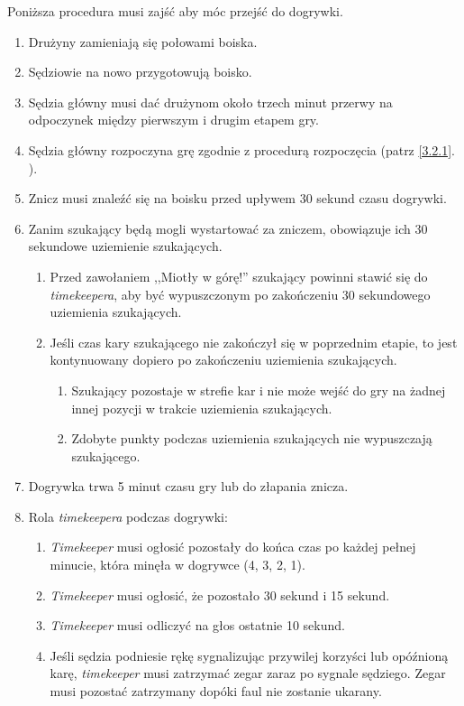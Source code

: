 \documentclass[11pt,a4paper]{article}
\renewcommand{\subsubsection}[1]{
  \oldsubsubsection{#1}%
  \label{\thesubsubsection}
}
\newcommand{\myref}[1]{\ref{#1}. \nameref{#1}}
\begin{document}
\subsubsection{Dogrywka}
Poniższa procedura musi zajść aby móc przejść do dogrywki.
\begin{enumerate}
  \item Drużyny zamieniają się połowami boiska.
  \item Sędziowie na nowo przygotowują boisko.
  \item Sędzia główny musi dać drużynom około trzech minut przerwy na odpoczynek między pierwszym i drugim etapem gry.
  \item Sędzia główny rozpoczyna grę zgodnie z procedurą rozpoczęcia (patrz \myref{3.2.1}).
  \item Znicz musi znaleźć się na boisku przed upływem 30 sekund czasu dogrywki.
  \item Zanim szukający będą mogli wystartować za zniczem, obowiązuje ich 30 sekundowe uziemienie szukających.
  \begin{enumerate}
    \item Przed zawołaniem ,,Miotły w górę!'' szukający powinni stawić się do \emph{timekeepera}, aby być wypuszczonym po zakończeniu 30 sekundowego uziemienia szukających.
    \item Jeśli czas kary szukającego nie zakończył się w poprzednim etapie, to jest kontynuowany dopiero po zakończeniu uziemienia szukających.
    \begin{enumerate}
      \item Szukający pozostaje w strefie kar i nie może wejść do gry na żadnej innej pozycji w trakcie uziemienia szukających.
      \item Zdobyte punkty podczas uziemienia szukających nie wypuszczają szukającego.
    \end{enumerate}
  \end{enumerate}
  \item Dogrywka trwa 5 minut czasu gry lub do złapania znicza.
  \item Rola \emph{timekeepera} podczas dogrywki:
  \begin{enumerate}
    \item \emph{Timekeeper} musi ogłosić pozostały do końca czas po każdej pełnej minucie, która minęła
    w dogrywce (4, 3, 2, 1).
    \item \emph{Timekeeper} musi ogłosić, że pozostało 30 sekund i 15 sekund.
    \item \emph{Timekeeper} musi odliczyć na głos ostatnie 10 sekund.
    \item Jeśli sędzia podniesie rękę sygnalizując przywilej korzyści lub opóźnioną karę, \emph{timekeeper} musi zatrzymać zegar zaraz po sygnale sędziego. Zegar musi pozostać
    zatrzymany dopóki faul nie zostanie ukarany.
  \end{enumerate}
\end{enumerate}
\end{document}
